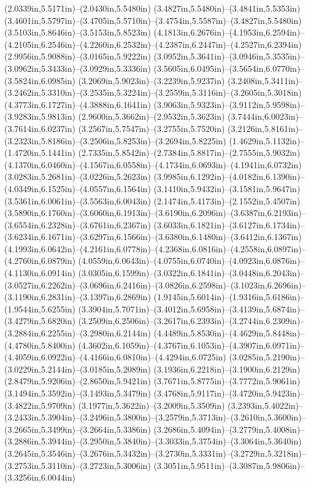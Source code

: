 (2.0339in,5.5171in)--(2.0430in,5.5480in) (3.4827in,5.5480in)--(3.4841in,5.5353in) (3.4601in,5.5797in)--(3.4705in,5.5710in)--(3.4754in,5.5587in)--(3.4827in,5.5480in) (3.5103in,5.8646in)--(3.5153in,5.8523in) (4.1813in,6.2676in)--(4.1953in,6.2594in)--(4.2105in,6.2546in)--(4.2260in,6.2532in)--(4.2387in,6.2447in)--(4.2527in,6.2394in) (2.9956in,5.9088in)--(3.0165in,5.9222in) (3.0952in,5.3641in)--(3.0946in,5.3535in)--(3.0962in,5.3433in)--(3.0929in,5.3336in) (3.5605in,6.0495in)--(3.5654in,6.0770in)--(3.5824in,6.0985in) (3.2069in,5.9023in)--(3.2239in,5.9237in) (3.2408in,5.3411in)--(3.2462in,5.3310in)--(3.2535in,5.3224in)--(3.2559in,5.3116in)--(3.2605in,5.3018in) (4.3773in,6.1727in)--(4.3888in,6.1641in) (3.9063in,5.9323in)--(3.9112in,5.9598in)--(3.9283in,5.9813in) (2.9600in,5.3662in)--(2.9532in,5.3623in) (3.7444in,6.0023in)--(3.7614in,6.0237in) (3.2567in,5.7547in)--(3.2755in,5.7520in) (3.2126in,5.8161in)--(3.2323in,5.8186in)--(3.2506in,5.8253in)--(3.2694in,5.8225in) (1.4629in,5.1132in)--(1.4720in,5.1441in) (2.7335in,5.8542in)--(2.7384in,5.8817in)--(2.7555in,5.9032in) (4.1370in,6.0460in)--(4.1567in,6.0558in)--(4.1734in,6.0693in)--(4.1941in,6.0732in) (3.0283in,5.2681in)--(3.0226in,5.2623in) (3.9985in,6.1292in)--(4.0182in,6.1390in)--(4.0349in,6.1525in)--(4.0557in,6.1564in) (3.1410in,5.9432in)--(3.1581in,5.9647in) (3.5361in,6.0061in)--(3.5563in,6.0043in) (2.1474in,5.4173in)--(2.1552in,5.4507in) (3.5890in,6.1760in)--(3.6060in,6.1913in)--(3.6190in,6.2096in)--(3.6387in,6.2193in)--(3.6554in,6.2328in)--(3.6761in,6.2367in) (3.6033in,6.1821in)--(3.6127in,6.1734in)--(3.6234in,6.1671in)--(3.6297in,6.1566in)--(3.6380in,6.1480in)--(3.6412in,6.1367in) (4.1993in,6.0642in)--(4.2161in,6.0778in)--(4.2368in,6.0816in)--(4.2558in,6.0897in)--(4.2760in,6.0879in) (4.0559in,6.0643in)--(4.0755in,6.0740in)--(4.0923in,6.0876in)--(4.1130in,6.0914in) (3.0305in,6.1599in)--(3.0322in,6.1841in)--(3.0448in,6.2043in)--(3.0527in,6.2262in)--(3.0696in,6.2416in)--(3.0826in,6.2598in)--(3.1023in,6.2696in)--(3.1190in,6.2831in)--(3.1397in,6.2869in) (1.9145in,5.6014in)--(1.9316in,5.6186in)--(1.9544in,5.6255in) (3.3904in,5.7071in)--(3.4012in,5.6958in)--(3.4139in,5.6874in)--(3.4279in,5.6820in) (3.2509in,6.2506in)--(3.2617in,6.2393in)--(3.2744in,6.2309in)--(3.2884in,6.2255in)--(3.2980in,6.2144in) (4.4489in,5.8530in)--(4.4629in,5.8448in)--(4.4780in,5.8400in) (4.3602in,6.1059in)--(4.3767in,6.1053in)--(4.3907in,6.0971in)--(4.4059in,6.0922in)--(4.4166in,6.0810in)--(4.4294in,6.0725in) (3.0285in,5.2190in)--(3.0229in,5.2144in)--(3.0185in,5.2089in) (3.1936in,6.2218in)--(3.1900in,6.2129in) (2.8479in,5.9206in)--(2.8650in,5.9421in) (3.7671in,5.8775in)--(3.7772in,5.9061in) (3.1494in,5.3592in)--(3.1493in,5.3479in) (3.4768in,5.9117in)--(3.4720in,5.9423in)--(3.4822in,5.9709in) (3.1977in,5.3622in)--(3.2009in,5.3509in) (3.2393in,5.4022in)--(3.2433in,5.3904in)--(3.2496in,5.3800in)--(3.2579in,5.3713in)--(3.2610in,5.3600in)--(3.2665in,5.3499in)--(3.2664in,5.3386in) (3.2686in,5.4094in)--(3.2779in,5.4008in)--(3.2886in,5.3944in)--(3.2950in,5.3840in)--(3.3033in,5.3754in)--(3.3064in,5.3640in) (3.2645in,5.3546in)--(3.2676in,5.3432in)--(3.2730in,5.3331in)--(3.2729in,5.3218in)--(3.2753in,5.3110in)--(3.2723in,5.3006in) (3.3051in,5.9511in)--(3.3087in,5.9806in)--(3.3256in,6.0044in) 